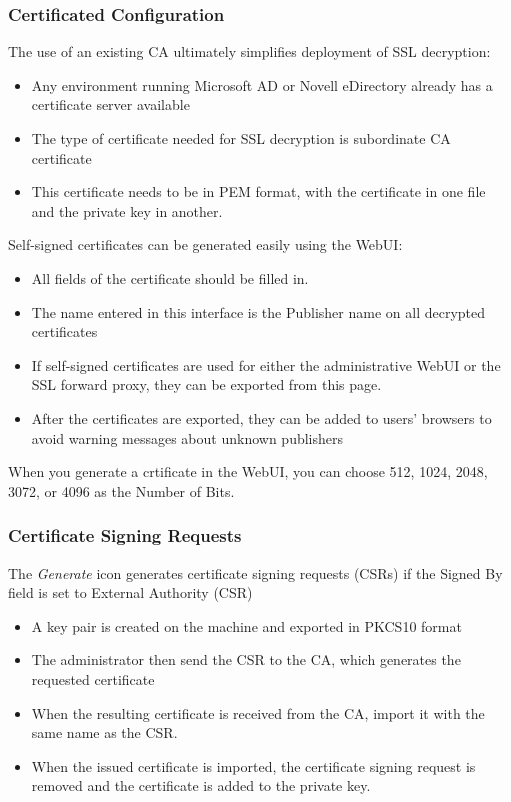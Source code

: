 \subsubsection{Certificated Configuration}
The use of an existing CA ultimately simplifies deployment of SSL decryption:
\begin{itemize}
    \item Any environment running Microsoft AD or Novell eDirectory already has a certificate server available
    \item The type of certificate needed for SSL decryption is subordinate CA certificate
    \item This certificate needs to be in PEM format, with the certificate in one file and the private key in another.
\end{itemize}

Self-signed certificates can be generated easily using the WebUI:
\begin{itemize}
    \item All fields of the certificate should be filled in.
    \item The name entered in this interface is the Publisher name on all decrypted certificates
    \item If self-signed certificates are used for either the administrative WebUI or the SSL forward proxy, they can be exported from this page.
    \item After the certificates are exported, they can be added to users' browsers to avoid warning messages about unknown publishers
\end{itemize}
When you generate a crtificate in the WebUI, you can choose 512, 1024, 2048, 3072, or 4096 as the Number of Bits. 

\subsubsection{Certificate Signing Requests}
The \textit{Generate} icon generates certificate signing requests (CSRs) if the Signed By field is set to External Authority (CSR)
\begin{itemize}
    \item A key pair is created on the machine and exported in PKCS10 format
    \item The administrator then send the CSR to the CA, which generates the requested certificate
    \item When the resulting certificate is received from the CA, import it with the same name as the CSR.
    \item When the issued certificate is imported, the certificate signing request is removed and the certificate is added to the private key.
\end{itemize}

